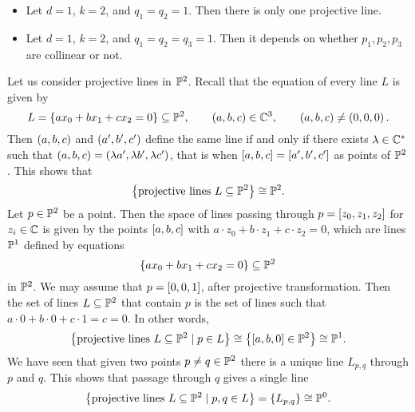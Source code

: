 \begin{example*}
\hfill
\begin{itemize}
\item Let $ d = 1 $, $ k = 2 $, and $ q_1 = q_2 = 1 $. Then there is only one projective line.
\item Let $ d = 1 $, $ k = 2 $, and $ q_1 = q_2 = q_3 = 1 $. Then it depends on whether $ p_1, p_2, p_3 $ are collinear or not.
\end{itemize}
\end{example*}

\begin{example}
Let us consider projective lines in $ \P^2 $. Recall that the equation of every line $ L $ is given by
$$ L = \cb{ax_0 + bx_1 + cx_2 = 0} \subseteq \P^2, \qquad \rb{a, b, c} \in \C^3, \qquad \rb{a, b, c} \ne \rb{0, 0, 0}. $$
Then $ \rb{a, b, c} $ and $ \rb{a', b', c'} $ define the same line if and only if there exists $ \lambda \in \C^* $ such that $ \rb{a, b, c} = \rb{\lambda a', \lambda b', \lambda c'} $, that is when $ \sb{a, b, c} = \sb{a', b', c'} $ as points of $ \P^2 $. This shows that
$$ \cb{\text{projective lines} \ L \subseteq \P^2} \cong \P^2. $$
Let $ p \in \P^2 $ be a point. Then the space of lines passing through $ p = \sb{z_0, z_1, z_2} $ for $ z_i \in \C $ is given by the points $ \sb{a, b, c} $ with $ a \cdot z_0 + b \cdot z_1 + c \cdot z_2 = 0 $, which are lines $ \P^1 $ defined by equations
$$ \cb{ax_0 + bx_1 + cx_2 = 0} \subseteq \P^2 $$
in $ \P^2 $. We may assume that $ p = \sb{0, 0, 1} $, after projective transformation. Then the set of lines $ L \subseteq \P^2 $ that contain $ p $ is the set of lines such that $ a \cdot 0 + b \cdot 0 + c \cdot 1 = c = 0 $. In other words,
$$ \cb{\text{projective lines} \ L \subseteq \P^2 \mid p \in L} \cong \cb{\sb{a, b, 0} \in \P^2} \cong \P^1. $$
We have seen that given two points $ p \ne q \in \P^2 $ there is a unique line $ L_{p, q} $ through $ p $ and $ q $. This shows that passage through $ q $ gives a single line
$$ \cb{\text{projective lines} \ L \subseteq \P^2 \mid p, q \in L} = \cb{L_{p, q}} \cong \P^0. $$
\end{example}

